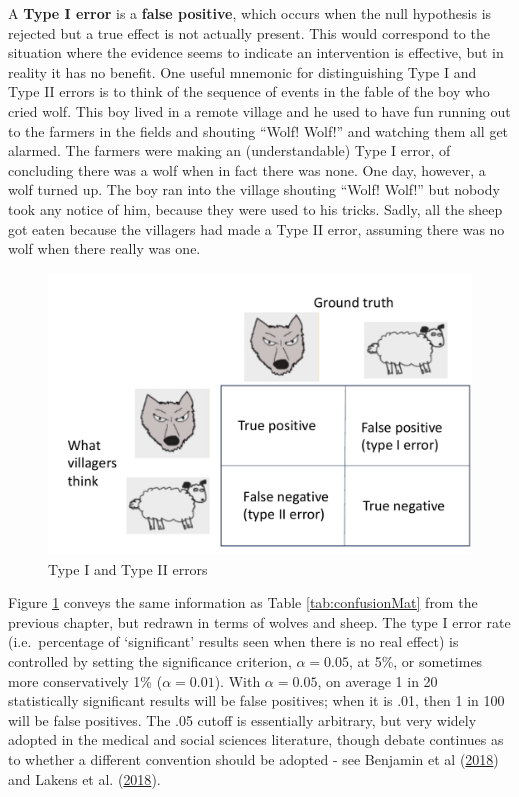 \documentclass{krantz}
\begin{document}
A \textbf{Type I error} is a \textbf{false positive}, which occurs when the null hypothesis is rejected but a true effect is not actually present. This would correspond to the situation where the evidence seems to indicate an intervention is effective, but in reality it has no benefit. One useful mnemonic for distinguishing Type I and Type II errors is to think of the sequence of events in the fable of the boy who cried wolf. This boy lived in a remote village and he used to have fun running out to the farmers in the fields and shouting ``Wolf! Wolf!'' and watching them all get alarmed. The farmers were making an (understandable) Type I error, of concluding there was a wolf when in fact there was none. One day, however, a wolf turned up. The boy ran into the village shouting ``Wolf! Wolf!'' but nobody took any notice of him, because they were used to his tricks. Sadly, all the sheep got eaten because the villagers had made a Type II error, assuming there was no wolf when there really was one.

\begin{figure}
\includegraphics[width=0.8\linewidth]{images_bw/wolfsheeprevised} \caption{Type I and Type II errors}\label{fig:wolfsheepfig}
\end{figure}

Figure \ref{fig:wolfsheepfig} conveys the same information as Table \ref{tab:confusionMat} from the previous chapter, but redrawn in terms of wolves and sheep. The type I error rate (i.e.~percentage of `significant' results seen when there is no real effect) is controlled by setting the significance criterion, \(\alpha=0.05\), at 5\%, or sometimes more conservatively 1\% (\(\alpha=0.01\)). With \(\alpha=0.05\), on average 1 in 20 statistically significant results will be false positives; when it is .01, then 1 in 100 will be false positives. The .05 cutoff is essentially arbitrary, but very widely adopted in the medical and social sciences literature, though debate continues as to whether a different convention should be adopted - see Benjamin et al (\protect\hyperlink{ref-benjamin2018}{2018}) and Lakens et al. (\protect\hyperlink{ref-lakens2018}{2018}).
\end{document}
